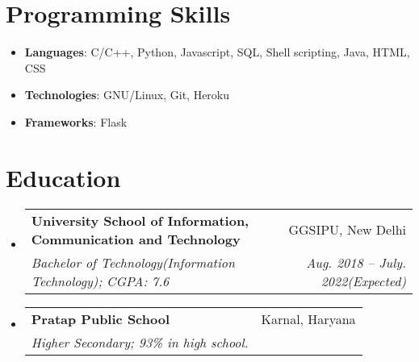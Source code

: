 \documentclass[letterpaper,11pt]{article}
\makeatletter
\newcommand{\resumeSubheading}[4]{
  \vspace{-1pt}\item
    \begin{tabular*}{0.97\textwidth}[t]{l@{\extracolsep{\fill}}r}
      \textbf{#1} & #2 \\
      \textit{\small#3} & \textit{\small #4} \\ 
    \end{tabular*}\vspace{-5pt}
}
\newcommand{\resumeSubHeadingListStart}{\begin{itemize}[leftmargin=*]}
\newcommand{\resumeSubHeadingListEnd}{\end{itemize}}
\makeatother
\begin{document}
\section{Programming Skills}
  \resumeSubHeadingListStart
    \item{
      \textbf{Languages}{: C/C++, Python, Javascript, SQL, Shell scripting, Java, HTML, CSS}}
    \item{
      \textbf{Technologies}{: GNU/Linux, Git, Heroku}}
    \item{
      \textbf{Frameworks}{: Flask}}
  
  \resumeSubHeadingListEnd


\section{Education}
  \resumeSubHeadingListStart
    \resumeSubheading
      {University School of Information, Communication and Technology}{GGSIPU, New Delhi}
      {Bachelor of Technology(Information Technology);  CGPA: 7.6}{Aug. 2018 -- July. 2022(Expected)}
    \resumeSubheading
      {Pratap Public School}{Karnal, Haryana}
      {Higher Secondary; 93\% in high school.}{}
  \resumeSubHeadingListEnd





\end{document}
